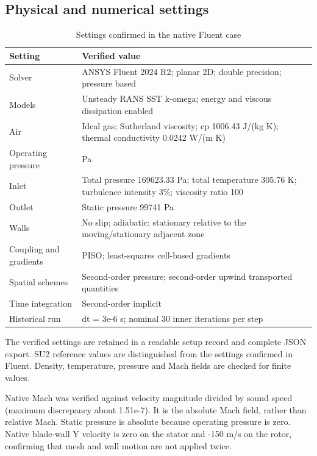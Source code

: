 \documentclass[11pt,a4paper]{article}
\begin{document}
\subsection{Physical and numerical settings}
\par
\begin{table}[!htbp]
\centering
\caption{Settings confirmed in the native Fluent case}
\label{tab:3}
\small\renewcommand{\arraystretch}{1.16}
\begin{tabularx}{\linewidth}{@{}>{\raggedright\arraybackslash}X >{\raggedright\arraybackslash}X@{}}
\toprule
\textbf{Setting} & \textbf{Verified value} \\
\midrule
Solver & ANSYS Fluent 2024 R2; planar 2D; double precision; pressure based \\
Models & Unsteady RANS SST k-omega; energy and viscous dissipation enabled \\
Air & Ideal gas; Sutherland viscosity; cp 1006.43 J/(kg K); thermal conductivity 0.0242 W/(m K) \\
Operating pressure & 0 Pa \\
Inlet & Total pressure 169623.33 Pa; total temperature 305.76 K; turbulence intensity 3\%; viscosity ratio 100 \\
Outlet & Static pressure 99741 Pa \\
Walls & No slip; adiabatic; stationary relative to the moving/stationary adjacent zone \\
Coupling and gradients & PISO; least-squares cell-based gradients \\
Spatial schemes & Second-order pressure; second-order upwind transported quantities \\
Time integration & Second-order implicit \\
Historical run & dt = 3e-6 s; nominal 30 inner iterations per step \\
\bottomrule
\end{tabularx}
\end{table}
\par
The verified settings are retained in a readable setup record and complete JSON export. SU2 reference values are distinguished from the settings confirmed in Fluent. Density, temperature, pressure and Mach fields are checked for finite values.\par

Native Mach was verified against velocity magnitude divided by sound speed (maximum discrepancy about 1.51e-7). It is the absolute Mach field, rather than relative Mach. Static pressure is absolute because operating pressure is zero. Native blade-wall Y velocity is zero on the stator and -150 m/s on the rotor, confirming that mesh and wall motion are not applied twice.\par
\end{document}
